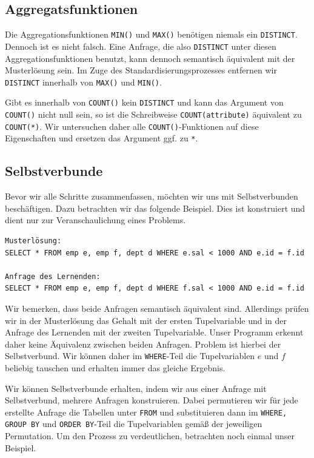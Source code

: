\subsection{Aggregatsfunktionen}

Die Aggregationsfunktionen \verb|MIN()| und \verb|MAX()| benötigen niemals ein \verb|DISTINCT|. Dennoch ist es nicht falsch. Eine Anfrage, die also \verb|DISTINCT| unter diesen Aggregationsfunktionen benutzt, kann dennoch semantisch äquivalent mit der Musterlösung sein. Im Zuge des Standardisierungsprozesses entfernen wir \verb|DISTINCT| innerhalb von \verb|MAX()| und \verb|MIN()|.

Gibt es innerhalb von \verb|COUNT()| kein \verb|DISTINCT| und kann das Argument von \verb|COUNT()| nicht null sein, so ist die Schreibweise \verb|COUNT(attribute)| äquivalent zu \verb|COUNT(*)|. Wir untersuchen daher alle \verb|COUNT()|-Funktionen auf diese Eigenschaften und ersetzen das Argument ggf. zu \verb|*|.

\subsection{Selbstverbunde}

Bevor wir alle Schritte zusammenfassen, möchten wir uns mit Selbstverbunden beschäftigen. Dazu betrachten wir das folgende Beispiel. Dies ist konstruiert und dient nur zur Veranschaulichung eines Problems.

\begin{verbatim}
Musterlösung:
SELECT * FROM emp e, emp f, dept d WHERE e.sal < 1000 AND e.id = f.id

Anfrage des Lernenden:
SELECT * FROM emp e, emp f, dept d WHERE f.sal < 1000 AND e.id = f.id
\end{verbatim}

Wir bemerken, dass beide Anfragen semantisch äquivalent sind. Allerdings prüfen wir in der Musterlösung das Gehalt mit der ersten Tupelvariable und in der Anfrage des Lernenden mit der zweiten Tupelvariable. Unser Programm erkennt daher keine Äquivalenz zwischen beiden Anfragen. Problem ist hierbei der Selbstverbund. Wir können daher im \verb|WHERE|-Teil die Tupelvariablen $e$ und $f$ beliebig tauschen und erhalten immer das gleiche Ergebnis. 

Wir können Selbstverbunde erhalten, indem wir aus einer Anfrage mit Selbstverbund, mehrere Anfragen konstruieren. Dabei permutieren wir für jede erstellte Anfrage die Tabellen unter \verb|FROM| und substituieren dann im \verb|WHERE, GROUP BY| und \verb|ORDER BY|-Teil die Tupelvariablen gemäß der jeweiligen Permutation. Um den Prozess zu verdeutlichen, betrachten noch einmal unser Beispiel. 

